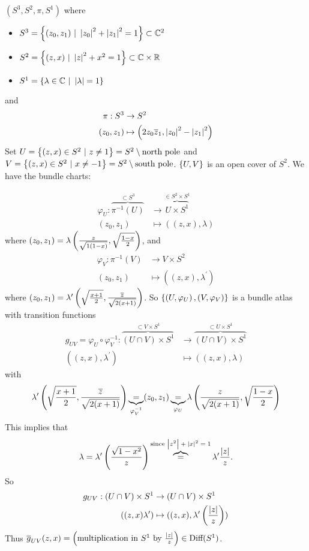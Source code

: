 \documentclass[main.tex]{subfiles}
\begin{document}
\begin{exmp}
 $(S^3, S^2, \pi, S^1)$ where
\begin{itemize}
    \item $S^3 = \brc{(z_0, z_1) \ | \ \anorm{z_0}^2 + \anorm{z_1}^2 = 1} \subset \C^2$
    \item $S^2 = \left\{ (z,x) \ | \ \left| z \right|^2 + x^2 = 1 \right\} \subset \mathbb{C} \times \mathbb{R}$
    \item $S^1 = \brc{ \lambda \in \C \ | \ \anorm{\lambda} = 1}$
\end{itemize}
and
\begin{align*}
    \pi: S^3 &\to S^2 \\
    (z_0, z_1) &\mapsto \left( 2z_0\overline{z}_1, \left| z_0 \right|^2 - \left| z_1 \right|^2 \right)
\end{align*}
Set $U = \left\{(z,x) \in S^2 \ | \ z \neq 1\right\} = S^2 \setminus \text{north pole}$ and $V = \left\{ (z,x) \in S^2 \ | \ x \neq -1 \right\} = S^2 \setminus \text{south pole}$. $\left\{U, V\right\}$ is an open cover of $S^2$. We have the bundle charts:

    \begin{align*}
    \varphi_U : \overbrace{\pi^{-1}(U)}^{\subset S^3} &\to \overbrace{U\times S^1}^{\in S^2 \times S^1} \\
    (z_0, z_1) &\mapsto ((z, x), \lambda)
    \end{align*} where $(z_0, z_1) = \lambda\left( \frac{z}{\sqrt{1(1-x)}}, \sqrt{\frac{1-x}{2}} \right)$, and
    \begin{align*}
        \varphi_V : \pi^{-1}(V) &\to V\times S^2 \\
         (z_0, z_1) &\mapsto ((z, x), \lambda^\prime)
     \end{align*} where $(z_0, z_1) = \lambda^\prime \left(  \sqrt{\frac{x+1}{2}}, \frac{\overline{z}}{\sqrt{2(x+1)}}  \right)$.
So $\left\{\left( U, \varphi_U \right), \left(  V, \varphi_V \right)\right\}$ is a bundle atlas with transition functions
\begin{align*}
g_{UV} = \varphi_U \circ \varphi_V^{-1} : \overbrace{(U \cap V) \times S^1}^{\subset V \times S^1} &\to  \overbrace{(U \cap V) \times S^1}^{\subset U \times S^1} \\
((z, x), \lambda^\prime) &\mapsto ((z,x), \lambda)
\end{align*} with
\[
\lambda^\prime \left( \sqrt{\frac{x+1}{2}}, \frac{\overline{z}}{\sqrt{2(x+1)}} \right) \underbrace{=}_{\varphi_V^{-1}} (z_0, z_1) \underbrace{=}_{\varphi_U}  \lambda \left(  \frac{z}{{\sqrt{2(x+1)}}}, \sqrt{\frac{1-x}{2} } \right)
\] This implies that
\[
\lambda = \lambda^\prime \left(  \frac{\sqrt{1-x^2}}{z} \right) \overbrace{=}^{\text{since $\left| z^2 \right|+\left| x \right|^2 = 1$}} \lambda^\prime \frac{\left| z \right|}{z}.
\]
So
\begin{align*}
    g_{UV} : (U \cap V) \times S^1 &\to (U \cap V) \times S^1 \\
    ((z, x) \lambda^\prime ) &\mapsto ((z,x), \lambda^\prime \left( \frac{\left| z \right|}{z} \right))
\end{align*}
Thus $\overline{g}_{UV}(z,x) = \left( \text{multiplication in $S^1$ by $\frac{\left| z \right|}{z}$} \right) \in \text{Diff}(S^1)$.
\end{exmp}
\end{document}

